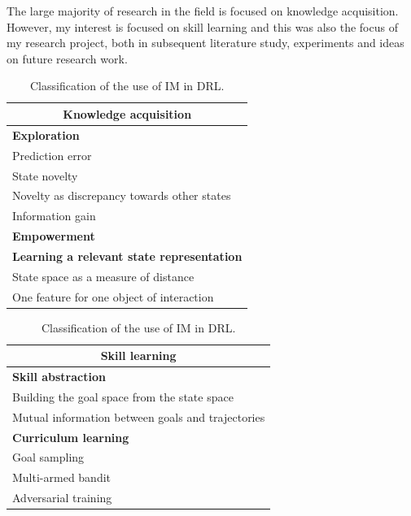 \documentclass[conference]{IEEEtran}
\begin{document}
The large majority of research in the field is focused on knowledge acquisition. However, my interest is focused on skill learning and this was also the focus of my research project, both in subsequent literature study, experiments and ideas on future research work.

\begin{table}[h]
  \centering
  \begin{subtable}[t]{0.45\columnwidth}
    \centering
    \begin{tabular}{|p{}|}
      \hline
      \multicolumn{1}{|c|}{\textbf{Knowledge acquisition}} \\
      \hline
      \hline
      \textbf{Exploration} \\
      \hline
      Prediction error \\
      State novelty \\
      Novelty as discrepancy towards other states \\
      Information gain \\
      \hline
      \hline
      \textbf{Empowerment} \\
      \hline
      \hline
      \textbf{Learning a relevant state representation} \\
      \hline
      State space as a measure of distance \\
      One feature for one object of interaction \\
      \hline
    \end{tabular}
  \end{subtable}
  \hspace{0em}
  \begin{subtable}[t]{0.45\columnwidth}
    \centering
    \begin{tabular}{|p{}|}
      \hline
      \multicolumn{1}{|c|}{\textbf{Skill learning}} \\
      \hline
      \hline
      \textbf{Skill abstraction} \\
      \hline
      Building the goal space from the state space \\
      Mutual information between goals and trajectories \\
      \hline
      \hline
      \textbf{Curriculum learning} \\
      \hline
      Goal sampling \\
      Multi-armed bandit \\
      Adversarial training \\
      \hline
    \end{tabular}
  \end{subtable}
  \caption{Classification of the use of IM in DRL.}
  \label{tab:classification}
\end{table}
\end{document}
